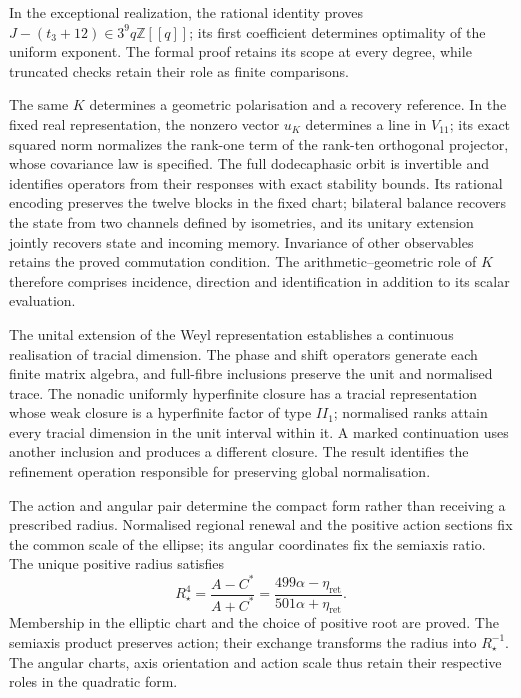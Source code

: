 In the exceptional realization,
the rational identity proves \(J-(t_3+12)\in3^9q\mathbb Z[[q]]\);
its first coefficient determines optimality of the uniform exponent.
The formal proof retains its scope at every degree, while truncated
checks retain their role as finite comparisons.

The same \(K\) determines a geometric polarisation and a recovery
reference. In the fixed real representation, the nonzero vector
\(u_K\) determines a line in \(V_{11}\); its exact squared norm
normalizes the rank-one term of the rank-ten orthogonal projector,
whose covariance law is specified. The full
dodecaphasic orbit is invertible and identifies operators from their
responses with exact stability bounds. Its rational encoding preserves
the twelve blocks in the fixed chart; bilateral balance recovers the
state from two channels defined by isometries, and its unitary extension jointly
recovers state and incoming memory. Invariance of other observables
retains the proved commutation condition. The arithmetic--geometric
role of \(K\) therefore comprises incidence, direction and identification
in addition to its scalar evaluation.

The unital extension of the Weyl representation establishes a continuous
realisation of tracial dimension. The phase and shift operators generate
each finite matrix algebra, and full-fibre inclusions preserve the unit
and normalised trace. The nonadic uniformly hyperfinite closure has a
tracial representation whose weak closure is a hyperfinite factor of
type \(II_1\); normalised ranks attain every tracial dimension in the
unit interval within it. A marked continuation uses another inclusion
and produces a different closure. The result identifies the refinement
operation responsible for preserving global normalisation.

The action and angular pair determine the compact form rather than
receiving a prescribed radius. Normalised regional renewal and the
positive action sections fix the common scale of the ellipse; its
angular coordinates fix the semiaxis ratio. The unique positive radius
satisfies
\[
 R_\star^4=\frac{A-C^*}{A+C^*}
 =\frac{499\alpha-\eta_{\mathrm{ret}}}{501\alpha+\eta_{\mathrm{ret}}}.
\]
Membership in the elliptic chart and the choice of positive root are
proved. The semiaxis product preserves action; their exchange transforms
the radius into \(R_\star^{-1}\). The angular charts, axis orientation
and action scale thus retain their respective roles in the quadratic
form.

